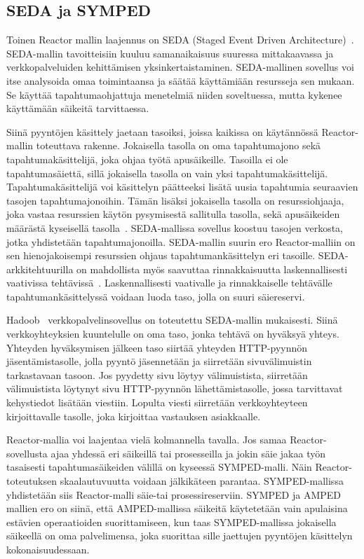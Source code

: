 \documentclass[finnish]{tktltiki2}%
\theoremstyle{definition}
\theoremstyle{remark}
\begin{document}
\subsection{SEDA ja SYMPED}

Toinen Reactor mallin laajennus on SEDA (Staged Event Driven Architecture)~\cite{welsh_seda_2001}.
SEDA-mallin tavoitteisiin kuuluu samanaikaisuus suuressa mittakaavassa ja
verkkopalveluiden kehittämisen yksinkertaistaminen.
SEDA-mallinen sovellus voi itse analysoida omaa toimintaansa
ja säätää käyttämiään resursseja sen  mukaan.
Se käyttää tapahtumaohjattuja menetelmiä niiden soveltuessa, mutta
kykenee käyttämään säikeitä tarvittaessa.

Siinä pyyntöjen käsittely jaetaan tasoiksi, joissa kaikissa on
käytännössä Reactor-mallin toteuttava rakenne. Jokaisella tasolla
on oma tapahtumajono sekä tapahtumakäsittelijä, joka ohjaa työtä
apusäikeille. Tasoilla ei ole tapahtumasäiettä, sillä
jokaisella tasolla on vain yksi tapahtumakäsittelijä.
Tapahtumakäsittelijä voi käsittelyn päätteeksi
lisätä uusia tapahtumia seuraavien tasojen tapahtumajonoihin.
Tämän lisäksi jokaisella tasolla on resurssiohjaaja,
joka vastaa resurssien käytön pysymisestä sallitulla tasolla,
sekä apusäikeiden määrästä kyseisellä tasolla~\cite{welsh_seda_2001}.
SEDA-mallissa sovellus koostuu tasojen verkosta, jotka
yhdistetään tapahtumajonoilla.
SEDA-mallin suurin ero Reactor-malliin
on sen hienojakoisempi resurssien ohjaus 
tapahtumankäsittelyn eri tasoille.
SEDA-arkkitehtuurilla on mahdollista myös saavuttaa rinnakkaisuutta
laskennallisesti vaativissa tehtävissä~\cite{welsh_seda_2001}. Laskennallisesti
vaativalle ja rinnakkaiselle tehtävälle tapahtumankäsittelyssä voidaan
luoda taso, jolla on suuri säiereservi.

Hadoob~\cite{welsh_seda_2001} verkkopalvelinsovellus on toteutettu SEDA-mallin mukaisesti.
Siinä verkkoyhteyksien kuuntelulle on oma taso, jonka tehtävä
on hyväksyä yhteys. Yhteyden hyväksymisen jälkeen taso siirtää yhteyden
HTTP-pyynnön jäsentämistasolle, jolla pyyntö jäsennetään ja siirretään
sivuvälimuistin tarkastavaan tasoon. Jos pyydetty sivu löytyy välimuistista,
siirretään välimuistista löytynyt sivu HTTP-pyynnön lähettämistasolle, jossa
tarvittavat kehystiedot lisätään viestiin. Lopulta
viesti siirretään verkkoyhteyteen kirjoittavalle tasolle, joka
kirjoittaa vastauksen asiakkaalle.

Reactor-mallia voi laajentaa vielä kolmannella tavalla.
Jos samaa Reactor-sovellusta ajaa yhdessä eri säikeillä tai prosesseilla
ja jokin säie jakaa työn tasaisesti tapahtumasäikeiden välillä
on kyseessä SYMPED-malli. Näin Reactor-toteutuksen
skaalautuvuutta voidaan jälkikäteen parantaa.
SYMPED-mallissa yhdistetään siis Reactor-malli säie-tai prosessireserviin.
SYMPED ja AMPED mallien ero on siinä, että 
AMPED-mallissa säikeitä käytetetään vain apulaisina
estävien operaatioiden suorittamiseen, kun taas
SYMPED-mallissa jokaisella säikeellä on oma palvelimensa,
joka suorittaa sille jaettujen pyyntöjen käsittelyn
kokonaisuudessaan.
\end{document}
